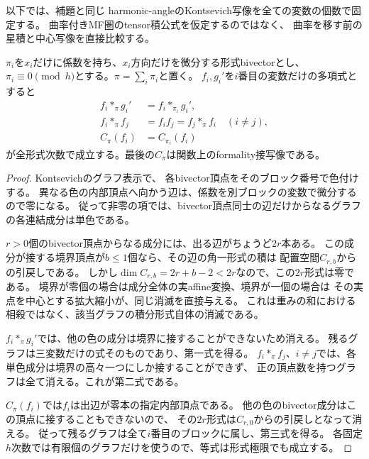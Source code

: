 以下では、補題と同じ
harmonic-angleのKontsevich写像を全ての変数の個数で固定する。
曲率付きMF圏のtensor積公式を仮定するのではなく、
曲率を移す前の星積と中心写像を直接比較する。

\begin{lemma}[独立ブロックに関するグラフの消滅]
\label{mpc:lem:graph-direct-sum}
$\pi_i$を$x_i$だけに係数を持ち、$x_i$方向だけを微分する形式bivectorとし、
$\pi_i\equiv0\pmod h$とする。$\pi=\sum_i\pi_i$と置く。
$f_i,g_i'$を$i$番目の変数だけの多項式とすると
\begin{equation}\label{mpc:eq:factor-star-center}
 \begin{aligned}
 f_i*_{\pi}g_i'&=f_i*_{\pi_i}g_i',\\
 f_i*_{\pi}f_j&=f_if_j=f_j*_{\pi}f_i\quad(i\ne j),\\
 C_{\pi}(f_i)&=C_{\pi_i}(f_i)
 \end{aligned}
\end{equation}
が全形式次数で成立する。最後の$C_\pi$は関数上のformality接写像である。
\end{lemma}
\begin{proof}
Kontsevichのグラフ表示\cite[Sections~5.1, 6.1--6.3]{NFMKontsevich}で、
各bivector頂点をそのブロック番号で色付けする。
異なる色の内部頂点へ向かう辺は、係数を別ブロックの変数で微分するので零になる。
従って非零の項では、bivector頂点同士の辺だけからなるグラフの各連結成分は単色である。

$r>0$個のbivector頂点からなる成分には、出る辺がちょうど$2r$本ある。
この成分が接する境界頂点が$b\le1$個なら、その辺の角一形式の積は
配置空間$C_{r,b}$からの引戻しである。
しかし$\dim C_{r,b}=2r+b-2<2r$なので、この$2r$形式は零である。
境界が零個の場合は成分全体の実affine変換、境界が一個の場合は
その実点を中心とする拡大縮小が、同じ消滅を直接与える。
これは重みの和における相殺ではなく、該当グラフの積分形式自体の消滅である。

$f_i*_{\pi}g_i'$では、他の色の成分は境界に接することができないため消える。
残るグラフは三変数だけの式そのものであり、第一式を得る。
$f_i*_{\pi}f_j$、$i\ne j$では、各単色成分は境界の高々一つにしか接することができず、
正の頂点数を持つグラフは全て消える。これが第二式である。

$C_\pi(f_i)$では$f_i$は出辺が零本の指定内部頂点である。
他の色のbivector成分はこの頂点に接することもできないので、
その$2r$形式は$C_{r,0}$からの引戻しとなって消える。
従って残るグラフは全て$i$番目のブロックに属し、第三式を得る。
各固定$h$次数では有限個のグラフだけを使うので、等式は形式極限でも成立する。
\end{proof}

